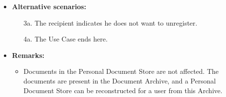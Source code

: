 \documentclass[a4paper,10pt]{article}
\begin{document}
\begin{itemize}
    \item \textbf{Alternative scenarios:} 
    \begin{enumerate}
        \item [3a.] The recipient indicates he does not want to unregister.
        \item [4a.] The Use Case ends here.
    \end{enumerate}
    
    \item \textbf{Remarks:}
        \begin{itemize}
            \item Documents in the Personal Document Store are not affected. The documents are present in the Document Archive, and a Personal Document Store can be reconstructed for a user from this Archive.
        \end{itemize}
\end{itemize}
\end{document}
